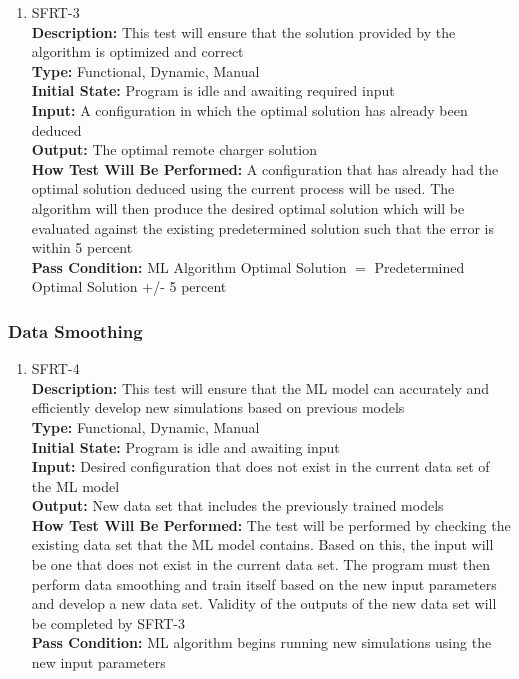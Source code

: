 \documentclass[12pt, titlepage]{article}
\begin{document}
\begin{enumerate}
    \hypertarget{SFRT-3Anchor}{}
    \item{SFRT-3\\}
    \textbf{Description:} This test will ensure that the solution provided by the algorithm is optimized and correct\\
    \textbf{Type:} Functional, Dynamic, Manual\\
    \textbf{Initial State:} Program is idle and awaiting required input\\
    \textbf{Input:} A configuration in which the optimal solution has already been deduced\\
    \textbf{Output:} The optimal remote charger solution\\
    \textbf{How Test Will Be Performed:} A configuration that has already had the optimal solution deduced using the current process will be used. The algorithm will then produce the desired optimal solution which will be evaluated against the existing predetermined solution such that the error is within 5 percent\\
    \textbf{Pass Condition:} ML Algorithm Optimal Solution $=$ Predetermined Optimal Solution +/- 5 percent\\
\end{enumerate}

\subsubsection{Data Smoothing}
\begin{enumerate}
    \hypertarget{SFRT-4Anchor}{}
    \item{SFRT-4\\}
    \textbf{Description:} This test will ensure that the ML model can accurately and efficiently develop new simulations based on previous models\\
    \textbf{Type:} Functional, Dynamic, Manual\\
    \textbf{Initial State:} Program is idle and awaiting input\\
    \textbf{Input:} Desired configuration that does not exist in the current data set of the ML model\\
    \textbf{Output:} New data set that includes the previously trained models\\
    \textbf{How Test Will Be Performed:} The test will be performed by checking the existing data set that the ML model contains. Based on this, the input will be one that does not exist in the current data set. The program must then perform data smoothing and train itself based on the new input parameters and develop a new data set. Validity of the outputs of the new data set will be completed by SFRT-3\\
    \textbf{Pass Condition:} ML algorithm begins running new simulations using the new input parameters\\
\end{enumerate}
\end{document}
